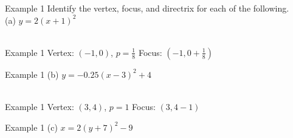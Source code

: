 \documentclass[t]{beamer}
\begin{document}
\begin{frame}{Example 1}
Identify the vertex, focus, and directrix for each of the following.    \newline\\  
(a) \quad $ y = 2(x+1)^2 $	\newline\\
	\newline\\
\end{frame}

\begin{frame}{Example 1 \quad Vertex: $(-1,0)$, $p = \tfrac{1}{8}$}
Focus: $\left(-1, 0 + \frac{1}{8}\right)$		
 \\[10pt]
\end{frame}

\begin{frame}{Example 1}
(b)	\quad	$y = -0.25(x-3)^2 + 4$	\newline\\
 \newline\\
\end{frame}

\begin{frame}{Example 1 \quad Vertex: $(3,4)$, $p=1$}
Focus: $(3,4-1)$	
	\\[8pt]
\end{frame}

\begin{frame}{Example 1}
(c)	\quad $x = 2(y+7)^2 - 9$	\newline\\
	\newline\\
\end{frame}
\end{document}
